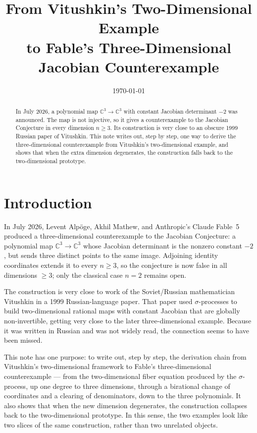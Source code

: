 \documentclass[11pt]{article}
\title{From Vitushkin's Two-Dimensional Example\\
       to Fable's Three-Dimensional Jacobian Counterexample}
\author{}
\date{\today}
\theoremstyle{plain}
\theoremstyle{definition}
\newcommand{\C}{\mathbb{C}}
\begin{document}
\maketitle

\begin{abstract}
In July 2026, a polynomial map $\C^3\to\C^3$ with constant Jacobian
determinant $-2$ was announced. The map is not injective, so it gives a
counterexample to the Jacobian Conjecture in every dimension $n\ge 3$. Its
construction is very close to an obscure 1999 Russian paper of Vitushkin.
This note writes out, step by step, one way to derive the three-dimensional
counterexample from Vitushkin's two-dimensional example, and shows that when
the extra dimension degenerates, the construction falls back to the
two-dimensional prototype.
\end{abstract}

\section*{Introduction}
In July 2026, Levent Alp\"oge, Akhil Mathew, and Anthropic's Claude Fable~5
produced a three-dimensional counterexample to the Jacobian Conjecture:
a polynomial map $\C^3\to\C^3$ whose Jacobian determinant is the nonzero
constant $-2$, but sends three distinct points to the same image.
Adjoining identity coordinates extends it to every $n\ge 3$, so the
conjecture is now false in all dimensions $\ge 3$; only the classical case
$n=2$ remains open.

The construction is very close to work of the Soviet/Russian mathematician Vitushkin in a 1999
Russian-language paper. That paper used $\sigma$-processes to build
two-dimensional rational maps with constant Jacobian that are globally
non-invertible, getting very close to the later three-dimensional example.
Because it was written in Russian and was not widely read, the connection
seems to have been missed.

This note has one purpose: to write out, step by step, the derivation chain
from Vitushkin's two-dimensional framework to Fable's three-dimensional
counterexample --- from the two-dimensional fiber equation produced by the
$\sigma$-process, up one degree to three dimensions, through a birational
change of coordinates and a clearing of denominators, down to the three
polynomials. It also shows that when the new dimension degenerates, the
construction collapses back to the two-dimensional prototype. In this sense,
the two examples look like two slices of the same construction, rather than
two unrelated objects.
\end{document}
